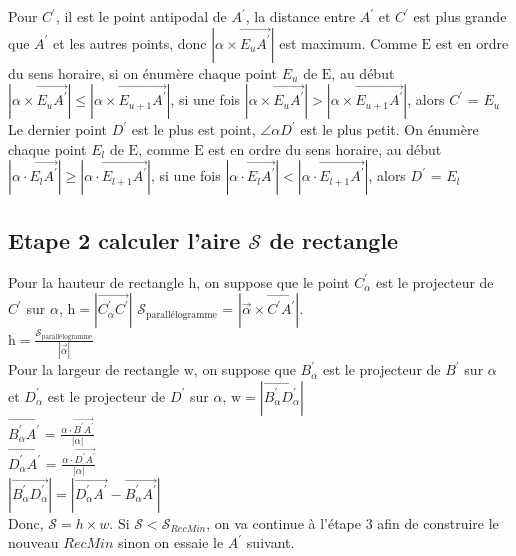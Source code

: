 \documentclass[14px]{article}
\begin{document}
Pour $C^{\prime}$, il est le point antipodal de $A^{\prime}$, la distance entre $A^{\prime}$ et $C^{\prime}$ est plus grande que $A^{\prime}$ et les autres points, donc $|\alpha\times\overrightarrow{E_{u}A^{\prime}}|$ est maximum. Comme $\mathrm{E}$ est en ordre du sens horaire, si on énumère chaque point $E_{u}$ de $\mathrm{E}$, au début $|\alpha\times\overrightarrow{E_{u}A^{\prime}}| \leqslant |\alpha\times\overrightarrow{E_{u+1}A^{\prime}}|$, si une fois $|\alpha\times\overrightarrow{E_{u}A^{\prime}}| > |\alpha\times\overrightarrow{E_{u+1}A^{\prime}}|$, alors $C^{\prime}$ = $E_{u}$\\

Le dernier point $D^{\prime}$ est le plus est point, $\angle \alpha D^{\prime}$ est le plus petit. On énumère chaque point $E_{l}$ de $\mathrm{E}$, comme $\mathrm{E}$ est en ordre du sens horaire, au début $|\alpha\cdot\overrightarrow{E_{l}A^{\prime}}| \geq|\alpha\cdot\overrightarrow{E_{l+1}A^{\prime}}|$, si une fois $|\alpha\cdot\overrightarrow{E_{l}A^{\prime}}| < |\alpha\cdot\overrightarrow{E_{l+1}A^{\prime}}|$, alors $D^{\prime}$ = $E_{l}$\\

\subsection{Etape 2 calculer l'aire $\mathcal{S}$ de rectangle}
Pour la hauteur de rectangle $\mathrm{h}$, on suppose que le point $C^{\prime}_{\alpha}$ est le projecteur de $C^{\prime}$ sur $\alpha$, $\mathrm{h}= |\overrightarrow{C^{\prime}_{\alpha}C^{\prime}}|$  
$\mathcal{S}_{\text{parallélogramme}}$ = $|\vec{\alpha}\times\overrightarrow{C^{\prime}A^{\prime}}|$. \\
$\mathrm{h} =  \frac{\mathcal{S}_{\text{parallélogramme}}}{|\vec{\alpha}|}$\\

Pour la largeur de rectangle $\mathrm{w}$, on suppose que $B^{\prime}_{\alpha}$ est le projecteur de $B^{\prime}$ sur $\alpha$ et $D^{\prime}_{\alpha}$ est le projecteur de $D^{\prime}$ sur $\alpha$, $\mathrm{w} = |\overrightarrow{B^{\prime}_{\alpha}D^{\prime}_{\alpha}}|$\\
$\overrightarrow{B^{\prime}_{\alpha}A^{\prime}}$ = $\frac{\alpha\cdot\overrightarrow{B^{\prime}A^{\prime}}}{|\alpha|}$\\
$\overrightarrow{D^{\prime}_{\alpha}A^{\prime}}$ = $\frac{\alpha\cdot\overrightarrow{D^{\prime}A^{\prime}}}{|\alpha|}$\\
$|\overrightarrow{B^{\prime}_{\alpha}D^{\prime}_{\alpha}}| = |\overrightarrow{D^{\prime}_{\alpha}A^{\prime}} - \overrightarrow{B^{\prime}_{\alpha}A^{\prime}}|$\\
Donc, $\mathcal{S} = h \times w$. Si $\mathcal{S} < \mathcal{S}_{RecMin}$, on va continue à l'étape 3 afin de construire le nouveau $RecMin$ sinon on essaie le $A^{\prime}$ suivant.\\ 
\end{document}
